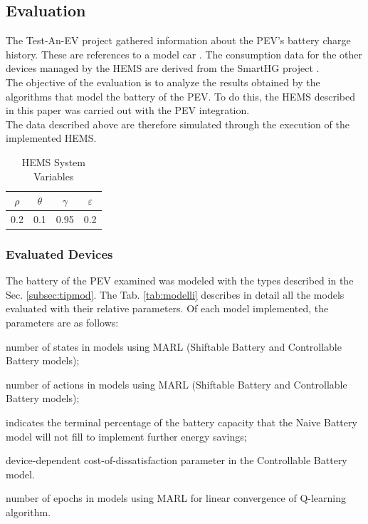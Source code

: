 \subsection{Evaluation}
The Test-An-EV project \cite{PEVdata} gathered information about the PEV's battery charge history. These are references to a model car \cite{pev}. The consumption data for the other devices managed by the HEMS are derived from the SmartHG project \cite{SmartHG}.\\
The objective of the evaluation is to analyze the results obtained by the algorithms that model the battery of the PEV. To do this, the HEMS described in this paper was carried out with the PEV integration.\\
The data described above are therefore simulated through the execution of the implemented HEMS.
\begin{table}[h]
    \center
    \caption{HEMS System Variables}
    \label{tab:variabili}
    \begin{tabular}{c|c|c|c}
        \hline
        \hline
        $\rho$ & $\theta$ & $\gamma$ & $\varepsilon$ \\
        \hline
        0.2 & 0.1 & 0.95 & 0.2 \\
        \hline
        \hline
    \end{tabular}
\end{table}



\subsubsection{Evaluated Devices}
The battery of the PEV examined was modeled with the types described in the Sec. \ref{subsec:tipmod}. The Tab. \ref{tab:modelli} describes in detail all the models evaluated with their relative parameters. Of each model implemented, the parameters are as follows:
\begin{description}
\addtolength{\itemindent}{0.5cm}
    \item [\# states] number of states in models using MARL (Shiftable Battery and Controllable Battery models);
    \item [\# actions] number of actions in models using MARL (Shiftable Battery and Controllable Battery models);
    \item [deficit] indicates the terminal percentage of the battery capacity that the Naive Battery model will not fill to implement further energy savings;
    \item [$\mathbf{\beta}$] device-dependent cost-of-dissatisfaction parameter in the Controllable Battery model.
    \item [\# epochs] number of epochs in models using MARL for linear convergence of Q-learning algorithm.
\end{description}



